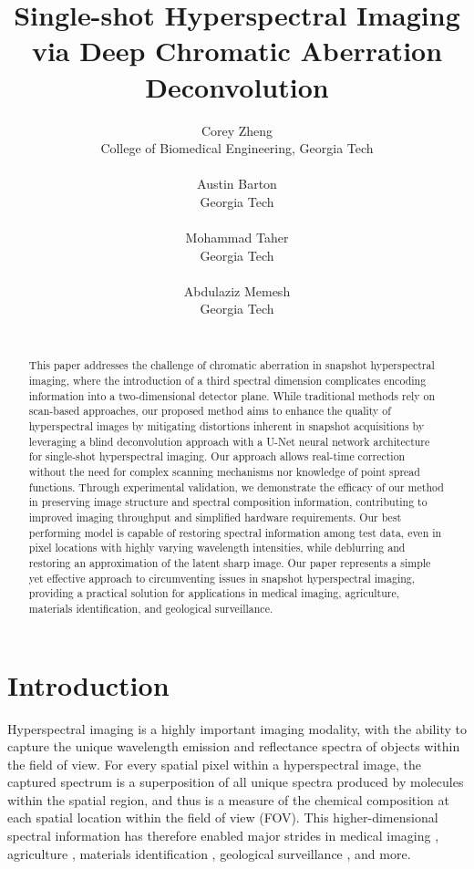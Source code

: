 \documentclass{article}
\title{Single-shot Hyperspectral Imaging via Deep Chromatic Aberration Deconvolution}
\author{%
   Corey Zheng \\
   College of Biomedical Engineering, Georgia Tech  \\
   \text{czheng45@gatech.edu} \\
   \AND
   Austin Barton \\
   Georgia Tech \\
   \text{abarton40@gatech.edu} \\
   \And
   Mohammad Taher \\
   Georgia Tech \\
   \text{mtaher3@gatech.edu} \\
   \And
   Abdulaziz Memesh \\
   Georgia Tech \\
   \text{a.memesh@gatech.edu} \\
}
\begin{document}
\maketitle


\begin{abstract}
  This paper addresses the challenge of chromatic aberration in snapshot hyperspectral imaging, where the introduction of a third spectral dimension complicates encoding information into a two-dimensional detector plane. While traditional methods rely on scan-based approaches, our proposed method aims to enhance the quality of hyperspectral images by mitigating distortions inherent in snapshot acquisitions by leveraging a blind deconvolution approach with a U-Net neural network architecture for single-shot hyperspectral imaging. Our approach allows real-time correction without the need for complex scanning mechanisms nor knowledge of point spread functions. Through experimental validation, we demonstrate the efficacy of our method in preserving image structure and spectral composition information, contributing to improved imaging throughput and simplified hardware requirements. Our best performing model is capable of restoring spectral information among test data, even in pixel locations with highly varying wavelength intensities, while deblurring and restoring an approximation of the latent sharp image. Our paper represents a simple yet effective approach to circumventing issues in snapshot hyperspectral imaging, providing a practical solution for applications in medical imaging, agriculture, materials identification, and geological surveillance.
\end{abstract}


\section{Introduction}
Hyperspectral imaging is a highly important imaging modality, with the ability to capture the unique wavelength emission and reflectance spectra of objects within the field of view. For every spatial pixel within a hyperspectral image, the captured spectrum is a superposition of all unique spectra produced by molecules within the spatial region, and thus is a measure of the chemical composition at each spatial location within the field of view (FOV). This higher-dimensional spectral information has therefore enabled major strides in medical imaging \cite{lu2014medical}, agriculture \cite{lu2020recent}, materials identification \cite{dong2019review}, geological surveillance \cite{peyghambari2021hyperspectral}, and more.  
\end{document}
